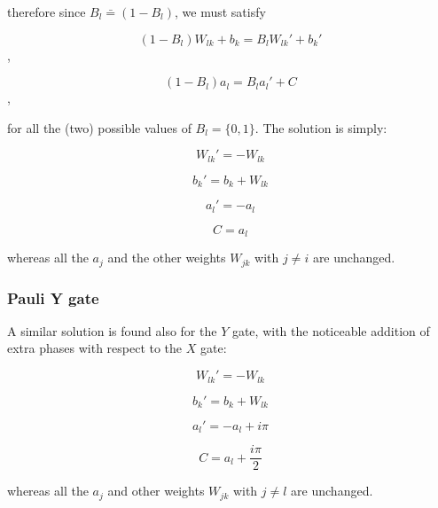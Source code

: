 therefore since $B_{l}\bar = (1-B_{l})$, we must satisfy 

\begin{equation}
    (1-B_{l})W_{lk} + b_{k} = B_{l} W_{lk}\prime + b_{k}\prime
\end{equation},

\begin{equation}
   (1-B_{l}) a_{l} = B_{l} a_{l}\prime + C 
\end{equation},

for all the (two) possible values of $B_{l} = \{0,1\}$. The solution is simply:

\begin{equation}
   W_{lk}\prime = -W_{lk}
\end{equation}

\begin{equation}
   b_{k}\prime = b_{k} + W_{lk}
\end{equation}

\begin{equation}
   a_{l}\prime = -a_{l}
\end{equation}

\begin{equation}
   C = a_{l}
\end{equation}

whereas all the $a_{j}$ and the other weights $W_{jk}$ with $j \neq i$ are unchanged.

\subsubsection{Pauli Y gate}
A similar solution is found also for the $Y$ gate, with the noticeable addition of extra phases
with respect to the $X$ gate:

\begin{equation}
   W_{lk}\prime = -W_{lk}
\end{equation}

\begin{equation}
   b_{k}\prime = b_{k} + W_{lk}
\end{equation}

\begin{equation}
   a_{l}\prime = -a_{l} + i \pi
\end{equation}

\begin{equation}
   C = a_{l} + \frac{i \pi}{2}
\end{equation}

whereas all the $a_{j}$ and other weights $W_{jk}$ with $j \neq l$ are unchanged.

